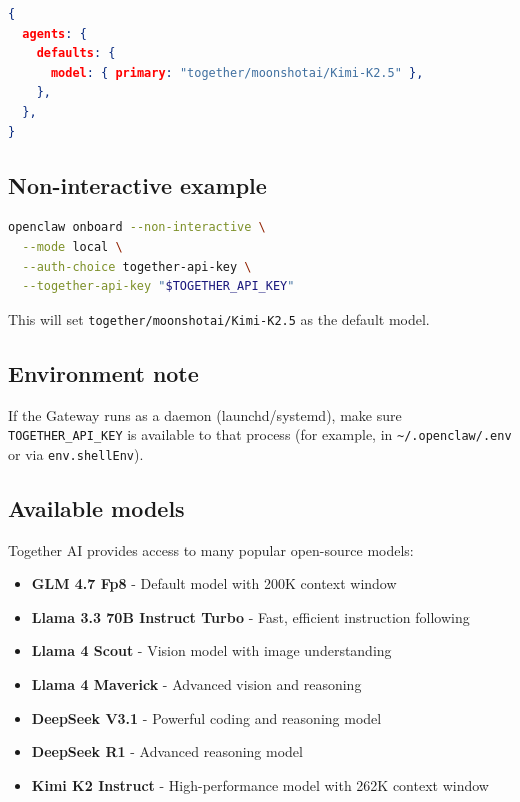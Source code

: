 \begin{lstlisting}[language=json]
{
  agents: {
    defaults: {
      model: { primary: "together/moonshotai/Kimi-K2.5" },
    },
  },
}
\end{lstlisting}


\subsection{Non-interactive example}


\begin{lstlisting}[language=bash]
openclaw onboard --non-interactive \
  --mode local \
  --auth-choice together-api-key \
  --together-api-key "$TOGETHER_API_KEY"
\end{lstlisting}


This will set \texttt{together/moonshotai/Kimi-K2.5} as the default model.

\subsection{Environment note}


If the Gateway runs as a daemon (launchd/systemd), make sure \texttt{TOGETHER\_API\_KEY}
is available to that process (for example, in \texttt{\textasciitilde{}/.openclaw/.env} or via
\texttt{env.shellEnv}).

\subsection{Available models}


Together AI provides access to many popular open-source models:

\begin{itemize}
  \item \textbf{GLM 4.7 Fp8} - Default model with 200K context window
  \item \textbf{Llama 3.3 70B Instruct Turbo} - Fast, efficient instruction following
  \item \textbf{Llama 4 Scout} - Vision model with image understanding
  \item \textbf{Llama 4 Maverick} - Advanced vision and reasoning
  \item \textbf{DeepSeek V3.1} - Powerful coding and reasoning model
  \item \textbf{DeepSeek R1} - Advanced reasoning model
  \item \textbf{Kimi K2 Instruct} - High-performance model with 262K context window
\end{itemize}


